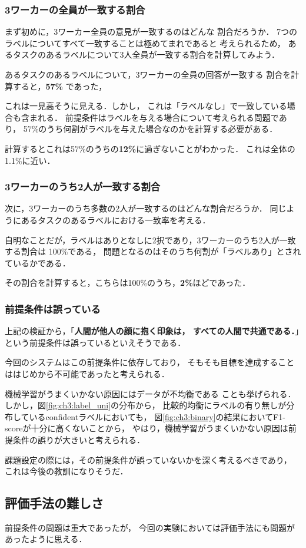 \subsubsection{3ワーカーの全員が一致する割合}
まず初めに，3ワーカー全員の意見が一致するのはどんな
割合だろうか．
7つのラベルについてすべて一致することは極めてまれであると
考えられるため，
あるタスクのあるラベルについて3人全員が一致する割合を計算してみよう．

あるタスクのあるラベルについて，3ワーカーの全員の回答が一致する
割合を計算すると，{\bf 57\% }であった，

これは一見高そうに見える．しかし，
これは「ラベルなし」で一致している場合も含まれる．
前提条件はラベルを与える場合について考えられる問題であり，
57\%のうち何割がラベルを与えた場合なのかを計算する必要がある．

計算するとこれは57\%のうちの{\bf12\%}に過ぎないことがわかった．
これは全体の1.1\%に近い．
\subsubsection{3ワーカーのうち2人が一致する割合}
次に，3ワーカーのうち多数の2人が一致するのはどんな割合だろうか．
同じようにあるタスクのあるラベルにおける一致率を考える．

自明なことだが，ラベルはありとなしに2択であり，3ワーカーのうち2人が一致する割合は
100\%である，
問題となるのはそのうち何割が「ラベルあり」とされているかである．

その割合を計算すると，こちらは100\%のうち，{\bf 2\%}ほどであった．
\subsubsection{前提条件は誤っている}
上記の検証から，「{\bf 人間が他人の顔に抱く印象は，
すべての人間で共通である．}」という前提条件は誤っているといえそうである．

今回のシステムはこの前提条件に依存しており，
そもそも目標を達成することははじめから不可能であったと考えられる．

機械学習がうまくいかない原因にはデータが不均衡である
ことも挙げられる．
しかし，図\ref{fig:ch3:label_uni}の分布から，
比較的均衡にラベルの有り無しが分布しているconfidentラベルにおいても，
図\ref{fig:ch3:binary}の結果においてF1-scoreが十分に高くないことから，
やはり，機械学習がうまくいかない原因は前提条件の誤りが大きいと考えられる．

課題設定の際には，その前提条件が誤っていないかを深く考えるべきであり，
これは今後の教訓になりそうだ．
\subsection{評価手法の難しさ}
前提条件の問題は重大であったが，
今回の実験においては評価手法にも問題があったように思える．

